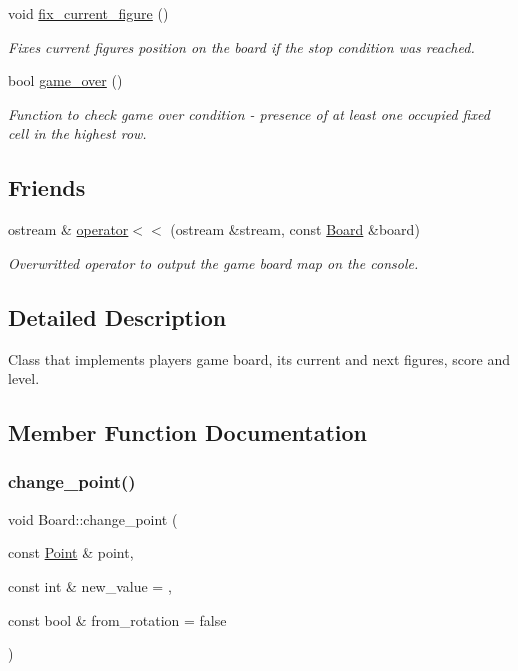 \begin{DoxyCompactItemize}
$$void \hyperlink{classBoard_a5dd4bc023e14e5c753f561dea1dd7c7c}{fix\+\_\+current\+\_\+figure} ()
\begin{DoxyCompactList}\small\item\em Fixes current figure\textquotesingle{}s position on the board if the stop condition was reached. \end{DoxyCompactList}\item 
bool \hyperlink{classBoard_a2ddde1803c244de76296d29712f58638}{game\+\_\+over} ()
\begin{DoxyCompactList}\small\item\em Function to check game over condition -\/ presence of at least one occupied fixed cell in the highest row. \end{DoxyCompactList}\end{DoxyCompactItemize}
\subsection*{Friends}
\begin{DoxyCompactItemize}
\item 
ostream \& \hyperlink{classBoard_ad17d0b33d9b8031d642c97ae1d1b1c7c}{operator$<$$<$} (ostream \&stream, const \hyperlink{classBoard}{Board} \&board)
\begin{DoxyCompactList}\small\item\em Overwritted operator to output the game board map on the console. \end{DoxyCompactList}\end{DoxyCompactItemize}


\subsection{Detailed Description}
Class that implements player\textquotesingle{}s game board, its current and next figures, score and level. 

\subsection{Member Function Documentation}
\mbox{\label{classBoard_a03a02aafb7bdfb8933a9cee1412755d6}} 
\subsubsection{\texorpdfstring{change\+\_\+point()}{change\_point()}}
{\footnotesize\ttfamily void Board\+::change\+\_\+point (\begin{DoxyParamCaption}\item[{const \hyperlink{classPoint}{Point} \&}]{point,  }\item[{const int \&}]{new\+\_\+value = {},  }\item[{const bool \&}]{from\+\_\+rotation = {\ttfamily false} }\end{DoxyParamCaption})}



